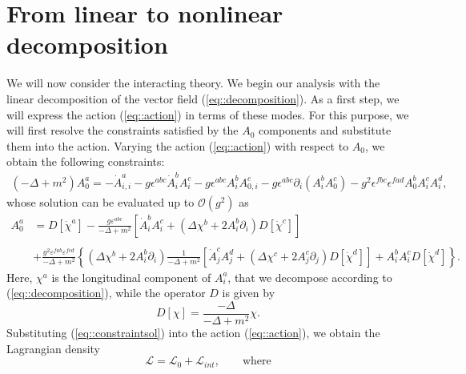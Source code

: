\documentclass{article}
\begin{document}
\section{From linear to nonlinear decomposition}

We will now consider the interacting theory. We begin our analysis with the linear decomposition of the vector field (\ref{eq::decomposition}). As a first step, we will express the action (\ref{eq::action}) in terms of these modes. For this purpose, we will first resolve the constraints satisfied by the $A_0$ components and substitute them into the action. Varying the action (\ref{eq::action}) with respect to $A_0$, we obtain the following constraints: 
\begin{equation}\label{eq::constraint}
\begin{split}
    (-\Delta+m^2)A_0^a=-\dot{A}_{i,i}^a-g\epsilon^{abc}\dot{A}_i^bA_i^c-g\epsilon^{abc}A_i^bA_{0,i}^c-g\epsilon^{abc}\partial_i(A_i^bA_0^c)-g^2\epsilon^{fbc}\epsilon^{fad}A_0^bA_i^cA_i^d,
\end{split}
\end{equation}
whose solution can be evaluated up to $\mathcal{O}\left(g^2\right)$ as
\begin{equation}\label{eq::constraintsol}
\begin{split}
    A_0^a&=D\left[\dot{\chi}^a\right]
    -\frac{g\varepsilon^{abc}}{-\Delta+m^2}\left[\dot{A}_i^bA_i^c+(\Delta\chi^b+2A_i^b\partial_i)D\left[\dot{\chi}^c\right]\right]\\\\
    &+\frac{g^2\varepsilon^{fab}\varepsilon^{fcd}}{-\Delta+m^2}\left\{(\Delta\chi^b+2A_i^b\partial_i)\frac{1}{-\Delta+m^2}\left[\dot{A}_j^cA_j^d+(\Delta\chi^c+2A_j^c\partial_j)D\left[\dot{\chi}^d\right]\right]+A_i^bA_i^cD\left[\dot{\chi}^d\right]\right\}.
\end{split}
\end{equation}
Here, $\chi^a$ is the longitudinal component of $A_i^a$, that we decompose according to (\ref{eq::decomposition}), while the operator $D$ is given by 
\begin{equation}
    D[\chi]=\frac{-\Delta}{-\Delta+m^2}\chi.
\end{equation}
Substituting (\ref{eq::constraintsol}) into the action (\ref{eq::action}), we obtain the Lagrangian density 
\begin{equation}\label{eq::Llin}
    \mathcal{L}=\mathcal{L}_0+\mathcal{L}_{int},\qquad\text{where}
\end{equation}
\end{document}
